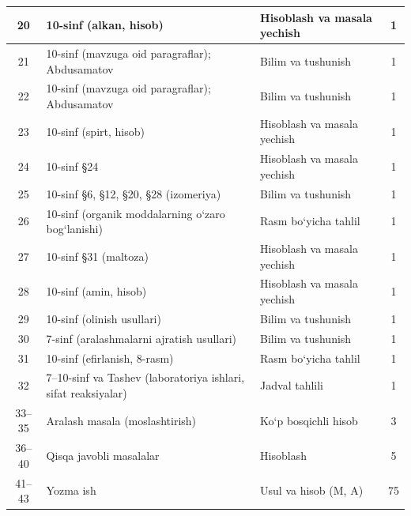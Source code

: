 \documentclass[11pt,a4paper]{article}
\begin{document}
{\begin{longtable}{|c|p{7.2cm}|p{5.4cm}|c|}
20 & 10-sinf (alkan, hisob) & Hisoblash va masala yechish & 1\\\hline
21 & 10-sinf (mavzuga oid paragraflar); Abdusamatov & Bilim va tushunish & 1\\\hline
22 & 10-sinf (mavzuga oid paragraflar); Abdusamatov & Bilim va tushunish & 1\\\hline
23 & 10-sinf (spirt, hisob) & Hisoblash va masala yechish & 1\\\hline
24 & 10-sinf \S{}24 & Hisoblash va masala yechish & 1\\\hline
25 & 10-sinf \S{}6, \S{}12, \S{}20, \S{}28 (izomeriya) & Bilim va tushunish & 1\\\hline
26 & 10-sinf (organik moddalarning o`zaro bog`lanishi) & Rasm bo`yicha tahlil & 1\\\hline
27 & 10-sinf \S{}31 (maltoza) & Hisoblash va masala yechish & 1\\\hline
28 & 10-sinf (amin, hisob) & Hisoblash va masala yechish & 1\\\hline
29 & 10-sinf (olinish usullari) & Bilim va tushunish & 1\\\hline
30 & 7-sinf (aralashmalarni ajratish usullari) & Bilim va tushunish & 1\\\hline
31 & 10-sinf (efirlanish, 8-rasm) & Rasm bo`yicha tahlil & 1\\\hline
32 & 7--10-sinf va Tashev (laboratoriya ishlari, sifat reaksiyalar) & Jadval tahlili & 1\\\hline
33--35 & Aralash masala (moslashtirish) & Ko`p bosqichli hisob & 3\\\hline
36--40 & Qisqa javobli masalalar & Hisoblash & 5\\\hline
41--43 & Yozma ish & Usul va hisob (M, A) & 75\\\hline
\end{longtable}}
\end{document}

